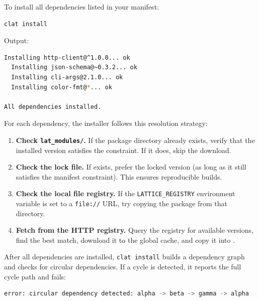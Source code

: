 To install all dependencies listed in your manifest:

\begin{lstlisting}[language=bash, numbers=none]
clat install
\end{lstlisting}

Output:

\begin{lstlisting}[language=bash, numbers=none]
  Installing http-client@^1.0.0... ok
  Installing json-schema@~0.3.2... ok
  Installing cli-args@2.1.0... ok
  Installing color-fmt@*... ok

All dependencies installed.
\end{lstlisting}

For each dependency, the installer follows this resolution strategy:

\begin{enumerate}
  \item \textbf{Check \texttt{lat\_modules/}.}
  If the package directory already exists, verify that the installed version satisfies the constraint.
  If it does, skip the download.

  \item \textbf{Check the lock file.}
  If  exists, prefer the locked version (as long as it still satisfies the manifest constraint).
  This ensures reproducible builds.

  \item \textbf{Check the local file registry.}
  If the \texttt{LATTICE\_REGISTRY} environment variable is set to a \lstinline|file://| URL, try copying the package from that directory.

  \item \textbf{Fetch from the HTTP registry.}
  Query the registry for available versions, find the best match, download it to the global cache, and copy it into .
\end{enumerate}

After all dependencies are installed, \texttt{clat install} builds a dependency graph and checks for circular dependencies.
If a cycle is detected, it reports the full cycle path and fails:

\begin{lstlisting}[language=bash, numbers=none]
error: circular dependency detected: alpha -> beta -> gamma -> alpha
\end{lstlisting}

